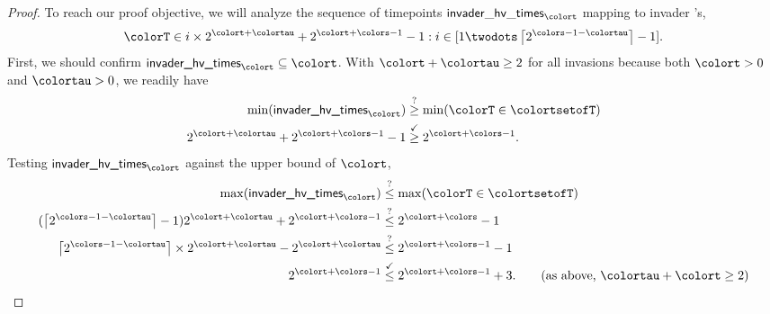 \begin{proof}
To reach our proof objective, we will analyze the sequence of timepoints $\mathsf{invader\_hv\_times}_{\colort}$ mapping to invader \hv{}'s,
\begin{align*}
\colorT \in i \times 2^{\colort + \colortau} +
2^{\colort + \colors - 1} - 1
:
i \in [1 \twodots \left\lceil2^{\colors - 1 - \colortau}\right\rceil - 1].
\end{align*}
First, we should confirm $\textsf{invader\_hv\_times}_{\colort} \subseteq \colort$.
With $\colort + \colortau \geq 2$ for all invasions because both $\colort > 0$ and $\colortau > 0$, we readily have
\begin{align*}
\min(\textsf{invader\_hv\_times}_{\colort})
&\stackrel{?}{\geq}
\min(\colorT \in \colortsetofT)\\
2^{\colort + \colortau} + 2^{\colort + \colors - 1} - 1
&\stackrel{\checkmark}{\geq}
2^{\colort + \colors - 1}.
\end{align*}
Testing $\textsf{invader\_hv\_times}_{\colort}$ against the upper bound of $\colort$,
\begin{align*}
\max(\textsf{invader\_hv\_times}_{\colort})
&\stackrel{?}{\leq}
\max(\colorT \in \colortsetofT)
\\
(\left\lceil 2^{\colors - 1 - \colortau} \right\rceil  - 1)
2^{\colort + \colortau} + 2^{\colort + \colors - 1}
&\stackrel{?}{\leq}
2^{\colort + \colors} - 1
\\
\left\lceil 2^{\colors - 1 - \colortau} \right\rceil \times 2^{\colort + \colortau} - 2^{\colort + \colortau}
&\stackrel{?}{\leq}
2^{\colort + \colors - 1} - 1
\\
2^{\colort + \colors - 1}
&\stackrel{\checkmark}{\leq}
2^{\colort + \colors - 1} + 3.
\tag{as above, $\colortau + \colort \geq 2$}
\end{align*}


\end{proof}
